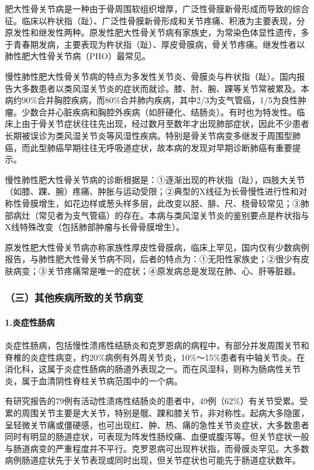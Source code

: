 肥大性骨关节病是一种由于骨周围软组织增厚，广泛性骨膜新骨形成而导致的综合征。临床以杵状指（趾）、广泛性骨膜新骨形成和关节疼痛、积液为主要表现，分原发性和继发性两种。原发性肥大性骨关节病有家族史，为常染色体显性遗传，多于青春期发病，主要表现为杵状指（趾）、厚皮骨膜病，骨关节疼痛。继发性者以肺性肥大性骨关节病（PHO）最常见。

慢性肺性肥大性骨关节病的特点为多发性关节炎、骨膜炎与杵状指（趾）。国内报告大多数患者以类风湿关节炎的症状而就诊。膝、肘、腕、踝等关节常被累及。本病约90\%合并胸腔疾病，而80\%合并肺内疾病，其中2/3为支气管癌，1/5为良性肿瘤。少数合并心脏疾病和胸腔外疾病（如肝硬化、结肠炎）。有时也为特发性。临床上由于骨关节症状往往先出现，经过数月至数年才出现肺部症状，因此不少患者长期被误诊为类风湿关节炎等风湿性疾病。特别是骨关节病变多继发于周围型肺癌，而此型肺癌早期往往无呼吸道症状，故本病的发现对早期诊断肺癌有重要提示。

慢性肺性肥大性骨关节病的诊断根据是：①逐渐出现的杵状指（趾），四肢大关节（如膝、踝、腕）疼痛、肿胀与运动受限；②典型的X线征为长骨慢性进行性和对称性骨膜增生，如花边样或葱头样多层，此改变以胫、腓、尺、桡骨较常见；③肺部病灶（常见者为支气管癌）的存在。本病与类风湿关节炎的鉴别要点是杵状指与X线特殊改变（包括肺部肿瘤与长骨骨膜增生）。

原发性肥大性骨关节病亦称家族性厚皮性骨膜病，临床上罕见，国内仅有少数病例报告，与肺性肥大性骨关节病不同，后者的特点为：①无阳性家族史；②很少有皮肤病变；③关节疼痛常是唯一的症状；④原发病总是发现在肺、心、肝等脏器。

\subsubsection{（三）其他疾病所致的关节病变}

\paragraph{1.炎症性肠病}

炎症性肠病，包括慢性溃疡性结肠炎和克罗恩病的病程中，有部分并发周围关节和脊椎的炎症性病变，约20\%病例有外周关节炎，10\%～15\%患者有中轴关节炎。在消化科，这属于炎症性肠病的肠道外表现之一。而在风湿科，则称为肠病性关节炎，属于血清阴性脊柱关节病范围中的一个病。

有研究报告的79例有活动性溃疡性结肠炎的患者中，49例（62\%）有关节受累。受累的周围关节主要是大关节，特别是髋、踝和膝关节，非对称性。起病大多隐匿，呈轻微关节痛或僵硬感，也可出现红、肿、热、痛的急性关节炎症状，大多数患者同时有明显的肠道症状，可表现为阵发性肠绞痛、血便或腹泻等。但关节症状一般与肠道病变的严重程度并不平行。克罗恩病可出现杵状指，而骨膜炎罕见。大多数病例肠道症状先于关节表现或同时出现，但关节症状也可能先于肠道症状数年。

